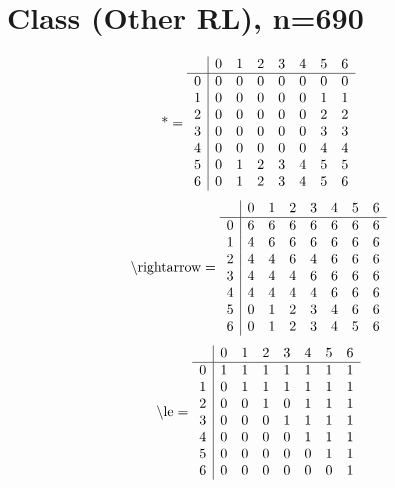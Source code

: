\documentclass[11pt]{article}
\begin{document}
\section{Class (Other RL), n=690}
\[\text{*} = 
\begin{array}{r | r r r r r r r}
 & 0 & 1 & 2 & 3 & 4 & 5 & 6 \\ \hline
0 & 0 & 0 & 0 & 0 & 0 & 0 & 0 \\
1 & 0 & 0 & 0 & 0 & 0 & 1 & 1 \\
2 & 0 & 0 & 0 & 0 & 0 & 2 & 2 \\
3 & 0 & 0 & 0 & 0 & 0 & 3 & 3 \\
4 & 0 & 0 & 0 & 0 & 0 & 4 & 4 \\
5 & 0 & 1 & 2 & 3 & 4 & 5 & 5 \\
6 & 0 & 1 & 2 & 3 & 4 & 5 & 6 \\
\end{array}
\]
\[\text{\textbackslash rightarrow} = 
\begin{array}{r | r r r r r r r}
 & 0 & 1 & 2 & 3 & 4 & 5 & 6 \\ \hline
0 & 6 & 6 & 6 & 6 & 6 & 6 & 6 \\
1 & 4 & 6 & 6 & 6 & 6 & 6 & 6 \\
2 & 4 & 4 & 6 & 4 & 6 & 6 & 6 \\
3 & 4 & 4 & 4 & 6 & 6 & 6 & 6 \\
4 & 4 & 4 & 4 & 4 & 6 & 6 & 6 \\
5 & 0 & 1 & 2 & 3 & 4 & 6 & 6 \\
6 & 0 & 1 & 2 & 3 & 4 & 5 & 6 \\
\end{array}
\]
\[\text{\textbackslash le} = 
\begin{array}{r | r r r r r r r}
 & 0 & 1 & 2 & 3 & 4 & 5 & 6 \\ \hline
0 & 1 & 1 & 1 & 1 & 1 & 1 & 1 \\
1 & 0 & 1 & 1 & 1 & 1 & 1 & 1 \\
2 & 0 & 0 & 1 & 0 & 1 & 1 & 1 \\
3 & 0 & 0 & 0 & 1 & 1 & 1 & 1 \\
4 & 0 & 0 & 0 & 0 & 1 & 1 & 1 \\
5 & 0 & 0 & 0 & 0 & 0 & 1 & 1 \\
6 & 0 & 0 & 0 & 0 & 0 & 0 & 1 \\
\end{array}
\]
\end{document}
